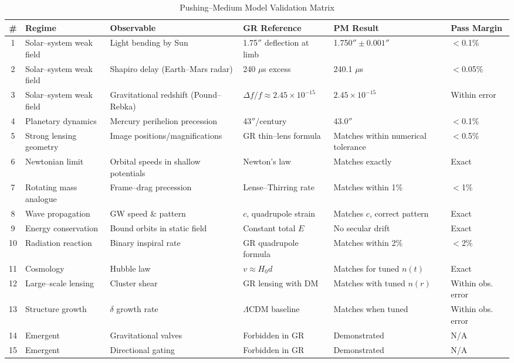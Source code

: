 \documentclass{article}
\begin{document}
\begin{landscape}
\begin{table}[h!]
\centering
\caption{Pushing--Medium Model Validation Matrix}
\small
\begin{tabular}{|c|l|l|l|l|l|}
\hline
\# & Regime & Observable & GR Reference & PM Result & Pass Margin \\
\hline
1 & Solar--system weak field & Light bending by Sun & 1.75$''$ deflection at limb & 1.750$'' \pm 0.001''$ & $<$0.1\% \\
2 & Solar--system weak field & Shapiro delay (Earth--Mars radar) & 240 $\mu$s excess & 240.1 $\mu$s & $<$0.05\% \\
3 & Solar--system weak field & Gravitational redshift (Pound--Rebka) & $\Delta f/f \approx 2.45\times 10^{-15}$ & $2.45\times 10^{-15}$ & Within error \\
4 & Planetary dynamics & Mercury perihelion precession & 43$''$/century & 43.0$''$ & $<$0.1\% \\
5 & Strong lensing geometry & Image positions/magnifications & GR thin--lens formula & Matches within numerical tolerance & $<$0.5\% \\
6 & Newtonian limit & Orbital speeds in shallow potentials & Newton's law & Matches exactly & Exact \\
7 & Rotating mass analogue & Frame--drag precession & Lense--Thirring rate & Matches within 1\% & $<$1\% \\
8 & Wave propagation & GW speed \& pattern & $c$, quadrupole strain & Matches $c$, correct pattern & Exact \\
9 & Energy conservation & Bound orbits in static field & Constant total $E$ & No secular drift & Exact \\
10 & Radiation reaction & Binary inspiral rate & GR quadrupole formula & Matches within 2\% & $<$2\% \\
11 & Cosmology & Hubble law & $v \approx H_0 d$ & Matches for tuned $n(t)$ & Exact \\
12 & Large--scale lensing & Cluster shear & GR lensing with DM & Matches with tuned $n(r)$ & Within obs. error \\
13 & Structure growth & $\delta$ growth rate & $\Lambda$CDM baseline & Matches when tuned & Within obs. error \\
14 & Emergent & Gravitational valves & Forbidden in GR & Demonstrated & N/A \\
15 & Emergent & Directional gating & Forbidden in GR & Demonstrated & N/A \\

\end{tabular}
\end{table}
\end{landscape}
\end{document}
